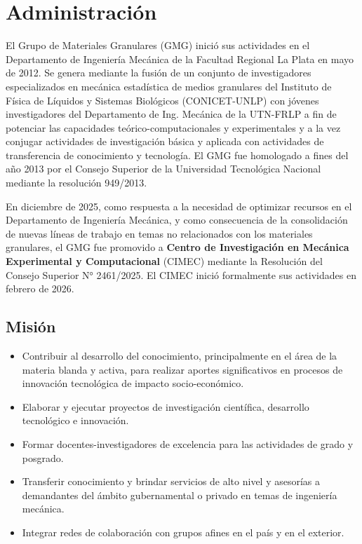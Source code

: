 \documentclass[a4paper,11pt,twoside,final,titlepage,onecolumn,openright]{report}
\begin{document}
\tableofcontents

\chapter{Administración}

El Grupo de Materiales Granulares (GMG) inició sus actividades en el Departamento de Ingeniería Mecánica de la Facultad Regional La Plata en mayo de 2012. Se genera mediante la fusión de un conjunto de investigadores especializados en mecánica estadística de medios granulares del Instituto de Física de Líquidos y Sistemas Biológicos (CONICET-UNLP) con jóvenes investigadores del Departamento de Ing. Mecánica de la UTN-FRLP a fin de potenciar las capacidades teórico-computacionales y experimentales y a la vez conjugar actividades de investigación básica y aplicada con actividades de transferencia de conocimiento y tecnología. El GMG fue homologado a fines del año 2013 por el Consejo Superior de la Universidad Tecnológica Nacional mediante la resolución 949/2013.

En diciembre de 2025, como respuesta a la necesidad de optimizar recursos en el Departamento de Ingeniería Mecánica, y como consecuencia de la consolidación de nuevas líneas de trabajo en temas no relacionados con los materiales granulares, el GMG fue promovido a \textbf{Centro de Investigación en Mecánica Experimental y Computacional} (CIMEC) mediante la Resolución del Consejo Superior N° 2461/2025. El CIMEC inició formalmente sus actividades en febrero de 2026.

\section{Misión}

\begin{itemize}
	\item Contribuir al desarrollo del conocimiento, principalmente en el área de la materia blanda y activa, para realizar aportes significativos en procesos de innovación tecnológica de impacto socio-económico.
	\item Elaborar y ejecutar proyectos de investigación científica, desarrollo tecnológico e innovación.
	\item Formar docentes-investigadores de excelencia para las actividades de grado y posgrado.
	\item Transferir conocimiento y brindar servicios de alto nivel y asesorías a demandantes del ámbito gubernamental o privado en temas de ingeniería mecánica.
	\item Integrar redes de colaboración con grupos afines en el país y en el exterior.
\end{itemize}
\end{document}
